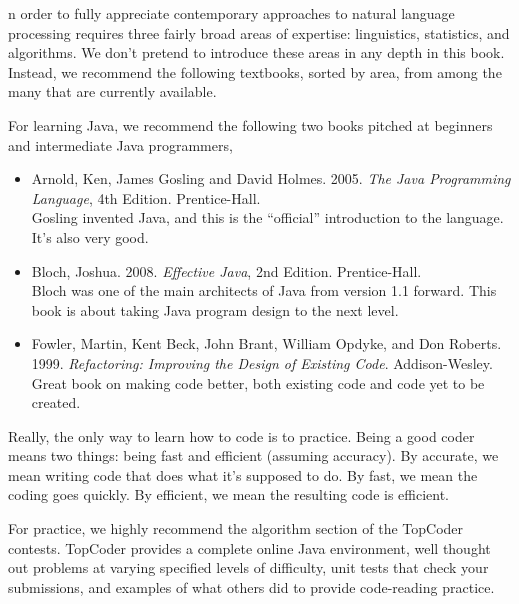 
\noindent
{}n order to fully appreciate contemporary approaches to natural language
processing requires three fairly broad areas of expertise:
linguistics, statistics, and algorithms.  We don't pretend to
introduce these areas in any depth in this book.  Instead, we
recommend the following textbooks, sorted by area, from among the many
that are currently available.


\noindent
For learning Java, we recommend the following two books pitched at
beginners and intermediate Java programmers,
%
\begin{itemize}
\item Arnold, Ken, James Gosling and David Holmes.  2005.
{\it The Java Programming Language}, 4th Edition.  Prentice-Hall.
\\
{\footnotesize Gosling invented Java, and this is the ``official'' introduction to the
language.  It's also very good.}
%
\item Bloch, Joshua. 2008. {\it Effective Java}, 2nd Edition.  Prentice-Hall.
\\
{\footnotesize Bloch was one of the main architects of Java from
version 1.1 forward.  This book is about taking Java program design
to the next level.}
%
\item
Fowler, Martin, Kent Beck, John Brant, William Opdyke, and Don Roberts.
1999.
{\it Refactoring: Improving the Design of Existing Code}.
Addison-Wesley.
\\
{\footnotesize Great book on making code better, both existing
code and code yet to be created.}
\end{itemize}
%



\noindent
Really, the only way to learn how to code is to practice.  Being a
good coder means two things: being fast and efficient (assuming
accuracy).  By accurate, we mean writing code that does what it's
supposed to do.  By fast, we mean the coding goes quickly.  By efficient,
we mean the resulting code is efficient.

For practice, we highly recommend the algorithm section of the
TopCoder contests.  TopCoder provides a complete online Java
environment, well thought out problems at varying specified levels of
difficulty, unit tests that check your submissions, and examples of
what others did to provide code-reading practice.
%
\begin{quote}
\end{quote}
%



